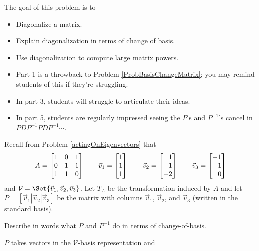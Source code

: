 \documentclass{workbook}
\newcommand{\displayonlynewpage}{\begin{displayonly}\newpage\end{displayonly}}
\newcommand{\bookonlynewpage}{\begin{bookonly}\newpage\end{bookonly}}
\begin{document}
\begin{slide}
	\bookonlynewpage
	\displayonlynewpage
	\question
	\begin{annotation}
		\begin{goals}

			The goal of this problem is to
			\begin{itemize}
				\item Diagonalize a matrix.
				\item Explain diagonalization in terms of change of basis.
				\item Use diagonalization to compute large matrix powers.
			\end{itemize}
		\end{goals}

		\begin{notes}
			\begin{itemize}
				\item Part 1 is a throwback to Problem \ref{ProbBasisChangeMatrix}; you may remind students
					of this if they're struggling.
				\item In part 3, students will struggle to articulate their ideas.
				\item In part 5, students are regularly impressed seeing the $P$'s and
					$P^{-1}$'s cancel in $PDP^{-1}PDP^{-1}\cdots$.
			\end{itemize}
		\end{notes}
	\end{annotation}
	Recall from Problem \ref{actingOnEigenvectors} that
	\[
		A=\mat{1&0&1\\0&1&1\\1&1&0}\qquad
		\vec v_1=\mat{1\\1\\1}\qquad
		\vec v_2=\mat{1\\1\\-2}\qquad
		\vec v_3=\mat{-1\\1\\0}
	\]
	and $\mathcal V=\Set{\vec v_1,\vec v_2, \vec v_3}$.
	Let $T_A$ be the transformation induced by $A$ and let $P=[\vec v_1|\vec v_2|\vec v_3]$ be the matrix
	with columns $\vec v_1$, $\vec v_2$, and $\vec v_3$ (written in the standard basis).
	\begin{parts}
		\item Describe in words what $P$ and $P^{-1}$ do in terms of change-of-basis.
			\begin{solution}
				$P$ takes vectors in the $\mathcal V$-basis representation and

\end{solution}
\end{parts}
\end{slide}
\end{document}
